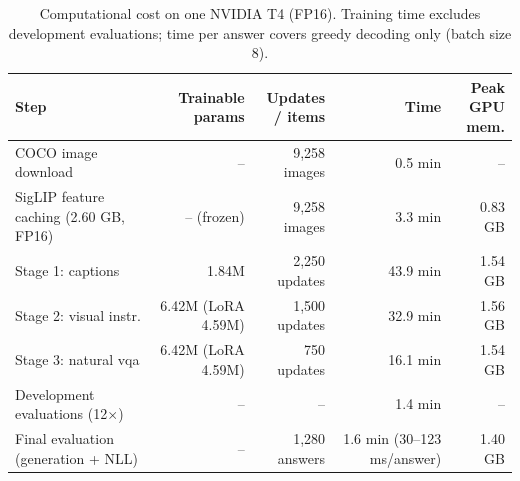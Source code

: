 \begin{table}[t]
\centering
\small
\caption{Computational cost on one NVIDIA T4 (FP16). Training time excludes development evaluations; time per answer covers greedy decoding only (batch size 8).}
\label{tab:t2-resources}
\begin{tabular}{>{\raggedright\arraybackslash}p{3.4cm}rrrr}
\toprule
Step & \makecell{Trainable\\params} & \makecell{Updates\\/ items} & Time & \makecell{Peak GPU\\mem.} \\
\midrule
COCO image download & – & 9,258 images & 0.5 min & – \\
SigLIP feature caching (2.60 GB, FP16) & – (frozen) & 9,258 images & 3.3 min & 0.83 GB \\
Stage 1: captions & 1.84M & 2,250 updates & 43.9 min & 1.54 GB \\
Stage 2: visual instr. & 6.42M (LoRA 4.59M) & 1,500 updates & 32.9 min & 1.56 GB \\
Stage 3: natural vqa & 6.42M (LoRA 4.59M) & 750 updates & 16.1 min & 1.54 GB \\
Development evaluations (12$\times$) & – & – & 1.4 min & – \\
Final evaluation (generation + NLL) & – & 1,280 answers & 1.6 min (30–123 ms/answer) & 1.40 GB \\
\bottomrule
\end{tabular}
\end{table}
